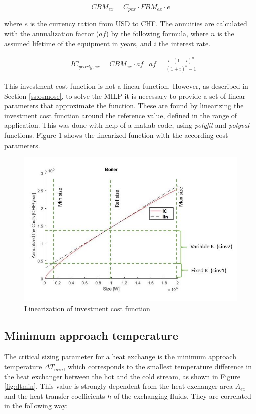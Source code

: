 \documentclass{article}
\begin{document}
\begin{equation}
CBM_{ex} = C_{pex} \cdot FBM_{ex} \cdot e 
\end{equation}

where $e$ is the currency ration from USD to CHF. The annuities are calculated with the annualization factor ($af$) by the following formula, where $n$ is the assumed lifetime of the equipment in years, and $i$ the interest rate. 

\begin{align}
	& IC_{yearly,ex} = CBM_{ex} \cdot af 
	& af = \frac{i \cdot (1 + i)^n}{(1 + i)^n - 1}
\end{align}

This investment cost function is not a linear function. However, as described in Section \ref{ss:osmose}, to solve the MILP it is necessary to provide a set of linear parameters that approximate the function. These are found by linearizing the investment cost function around the reference value, defined in the range of application. This was done with help of a matlab code, using \textit{polyfit} and \textit{polyval} functions. Figure \ref{fig:lin} shows the linearized function with the according cost parameters.

\begin{figure}[htp]
	\centering
	\includegraphics[scale=0.6]{Images/linearization_expl.jpg}
	\caption{Linearization of investment cost function}
	\label{fig:lin}
\end{figure}

\subsection{Minimum approach temperature}\label{ss:dtmin}
The critical sizing parameter for a heat exchange is the minimum approach temperature $\Delta T_{min}$, which corresponds to the smallest temperature difference in the heat exchanger between the hot and the cold stream, as shown in Figure \ref{fig:dtmin}. This value is strongly dependent from the heat exchanger area $A_{ex}$ and the heat transfer coefficients $h$ of the exchanging fluids. They are correlated in the following way: 
\end{document}

